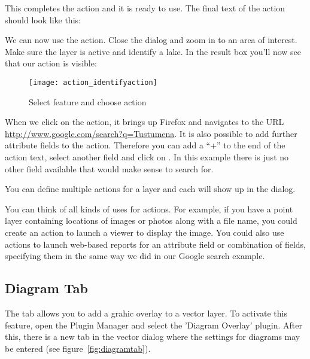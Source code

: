 This completes the action and it is ready to use. The final text of the action
should look like this:


We can now use the action. Close the  dialog and zoom in to an area
of interest. Make sure the  layer is active and identify a
lake. In the result box you'll now see that our action is visible:

\begin{figure}[ht]
   \centering
   \texttt{[image: action\_identifyaction]}
   \caption{Select feature and choose action \nixcaption}\label{fig:identify_action}
\end{figure}

When we click on the action, it brings up Firefox and navigates to the URL
\url{http://www.google.com/search?q=Tustumena}. It is also possible to add further
attribute fields to the action. Therefore you can add a ``+'' to the end of the action
text, select another field and click on . In this example there
is just no other field available that would make sense to search for.

You can define multiple actions for a layer and each will show up in the
 dialog.

You can think of all kinds of uses for actions. For example, if you have a point layer
containing locations of images or photos along with a file name, you could
create an action to launch a viewer to display the image. You could also use
actions to launch web-based reports for an attribute field or combination of
fields, specifying them in the same way we did in our Google search example.

\subsection{Diagram Tab}\label{sec:diagram}

The  tab allows you to add a grahic overlay to a vector layer.
To activate this feature, open the Plugin Manager and select the 'Diagram Overlay'
plugin. After this, there is a new tab in the vector  dialog where the settings for diagrams may be entered (see
figure~\ref{fig:diagramtab}).

